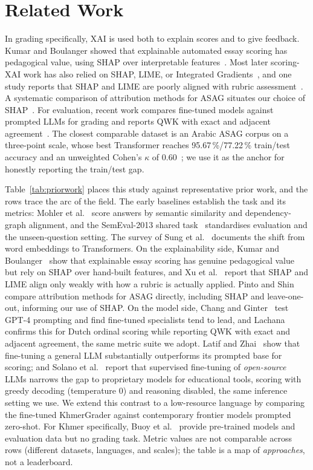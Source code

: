 \section{Related Work}
\label{sec:lit-related}
In grading specifically, XAI is used both to explain scores and to give feedback. Kumar and Boulanger
showed that explainable automated essay scoring has pedagogical value, using SHAP over interpretable
features~\citep{kumar2020explainable}. Most later scoring-XAI work has also relied on SHAP, LIME, or
Integrated Gradients~\citep{lachana2025dutch}, and one study reports that SHAP and LIME are poorly
aligned with rubric assessment~\citep{xu2025qwenscore}. A systematic comparison of attribution methods
for ASAG situates our choice of SHAP~\citep{pinto2025attribution}.
For evaluation, recent work compares fine-tuned models against prompted LLMs for grading and reports
QWK with exact and adjacent agreement~\citep{lachana2025dutch}. The closest comparable dataset is an
Arabic ASAG corpus on a three-point scale, whose best Transformer reaches 95.67\,\%/77.22\,\%
train/test accuracy and an unweighted Cohen's $\kappa$ of 0.60~\citep{alaoui2024}; we use it as the
anchor for honestly reporting the train/test gap.

Table~\ref{tab:priorwork} places this study against representative prior work, and the rows trace the
arc of the field. The early baselines establish the task and its metrics: Mohler et
al.~\citep{mohler2011} score answers by semantic similarity and dependency-graph alignment, and the
SemEval-2013 shared task~\citep{dzikovska2013} standardises evaluation and the unseen-question setting.
The survey of Sung et al.~\citep{sung2022survey} documents the shift from word embeddings to
Transformers. On the explainability side, Kumar and Boulanger~\citep{kumar2020explainable} show that
explainable essay scoring has genuine pedagogical value but rely on SHAP over hand-built features, and
Xu et al.~\citep{xu2025qwenscore} report that SHAP and LIME align only weakly with how a rubric is
actually applied. Pinto and Shin~\citep{pinto2025attribution} compare attribution methods for ASAG
directly, including SHAP and leave-one-out, informing our use of SHAP. On the model side,
Chang and Ginter~\citep{chang2024gpt4} test GPT-4 prompting and find fine-tuned specialists tend to
lead, and Lachana~\citep{lachana2025dutch} confirms this for Dutch ordinal scoring while reporting QWK
with exact and adjacent agreement, the same metric suite we adopt. Latif and
Zhai~\citep{latif2024finetuning} show that fine-tuning a general LLM substantially outperforms its
prompted base for scoring; and Solano et al.~\citep{solano2025narrowing} report that supervised
fine-tuning of \emph{open-source} LLMs narrows the gap to proprietary models for educational tools,
scoring with greedy decoding (temperature 0) and reasoning disabled, the same inference setting we use.
We extend this contrast to a low-resource language by comparing the
fine-tuned KhmerGrader against contemporary frontier models prompted zero-shot. For Khmer specifically, Buoy et
al.~\citep{buoy2022khmer} provide pre-trained models and evaluation data but no grading task. Metric
values are not comparable across rows (different datasets, languages, and scales); the table is a map of
\emph{approaches}, not a leaderboard.

